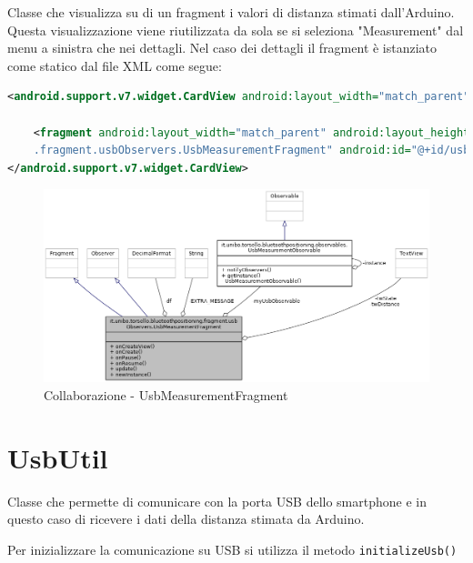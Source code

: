 Classe che visualizza su di un fragment i valori di distanza stimati dall'Arduino. Questa visualizzazione viene riutilizzata da sola se si seleziona "Measurement" dal menu a sinistra che nei dettagli. Nel caso dei dettagli il fragment è istanziato come statico dal file XML come segue:

\begin{lstlisting}[language=XML]
<android.support.v7.widget.CardView android:layout_width="match_parent"	android:layout_height="wrap_content" android:layout_margin="@dimen/card_margin">

	<fragment android:layout_width="match_parent" android:layout_height="wrap_content" android:name="it.unibo.torsello.bluetoothpositioning
	.fragment.usbObservers.UsbMeasurementFragment" android:id="@+id/usbArduino" tools:layout="@layout/fragment_usb_measurement" />
</android.support.v7.widget.CardView>
\end{lstlisting}

\begin{figure}[ph]
	\centering
	\includegraphics[width=1.6\linewidth,angle=90]{img/uml/class/classit_1_1unibo_1_1torsello_1_1bluetoothpositioning_1_1fragment_1_1usbObservers_1_1UsbMeasurementFragment__coll__graph.png}
	\caption{Collaborazione - UsbMeasurementFragment}
\end{figure}

\newpage
\section{UsbUtil}

Classe che permette di comunicare con la porta USB dello smartphone e in questo caso di ricevere i dati della distanza stimata da Arduino. 

Per inizializzare la comunicazione su USB si utilizza il metodo \texttt{initializeUsb()}
